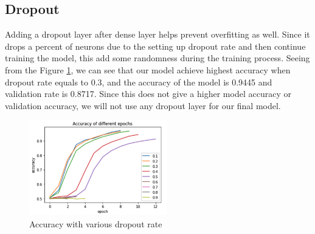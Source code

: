 \documentclass{article}
\begin{document}
\subsection{Dropout}
Adding a dropout layer after dense layer helps prevent overfitting as well. Since it drops a percent of neurons due to the setting up dropout rate and then continue training the model, this add some randomness during the training process. Seeing from the Figure \ref{fig:dr}, we can see that our model achieve highest accuracy when dropout rate equals to 0.3, and the accuracy of the model is 0.9445 and validation rate is 0.8717. Since this does not give a higher model accuracy or validation accuracy, we will not use any dropout layer for our final model.
\FloatBarrier
\begin{figure}[htb]
    \centering
    \includegraphics[width=6cm]{droprate}
    \caption{Accuracy with various dropout rate}
    \label{fig:dr}
\end{figure}
\FloatBarrier
\end{document}
